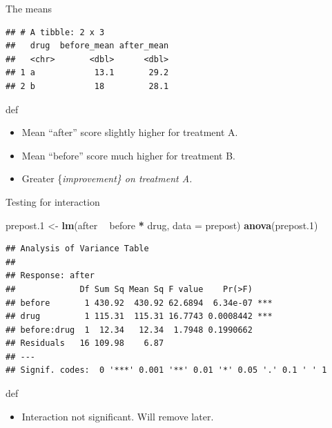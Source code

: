\documentclass[ignorenonframetext,]{beamer}
\newenvironment{Shaded}{\begin{snugshade}}{\end{snugshade}}
\newcommand{\DataTypeTok}[1]{\textcolor[rgb]{0.13,0.29,0.53}{#1}}
\newcommand{\FloatTok}[1]{\textcolor[rgb]{0.00,0.00,0.81}{#1}}
\newcommand{\KeywordTok}[1]{\textcolor[rgb]{0.13,0.29,0.53}{\textbf{#1}}}
\newcommand{\NormalTok}[1]{#1}
\newcommand{\OperatorTok}[1]{\textcolor[rgb]{0.81,0.36,0.00}{\textbf{#1}}}
\newcommand{\StringTok}[1]{\textcolor[rgb]{0.31,0.60,0.02}{#1}}
\providecommand{\tightlist}{%
  \setlength{\itemsep}{0pt}\setlength{\parskip}{0pt}}
\begin{document}
\begin{frame}[fragile]{The means}
\protect\hypertarget{the-means}{}

\begin{Shaded}
\end{Shaded}

\begin{verbatim}
## # A tibble: 2 x 3
##   drug  before_mean after_mean
##   <chr>       <dbl>      <dbl>
## 1 a            13.1       29.2
## 2 b            18         28.1
\end{verbatim}

def

\begin{itemize}
\item
  Mean ``after'' score slightly higher for treatment A.
\item
  Mean ``before'' score much higher for treatment B.
\item
  Greater \{\em improvement\} on treatment A.
\end{itemize}

\end{frame}

\begin{frame}[fragile]{Testing for interaction}
\protect\hypertarget{testing-for-interaction}{}

\begin{Shaded}
\begin{Highlighting}[]
\NormalTok{prepost}\FloatTok{.1}\NormalTok{ <-}\StringTok{ }\KeywordTok{lm}\NormalTok{(after }\OperatorTok{~}\StringTok{ }\NormalTok{before }\OperatorTok{*}\StringTok{ }\NormalTok{drug, }\DataTypeTok{data =}\NormalTok{ prepost)}
\KeywordTok{anova}\NormalTok{(prepost}\FloatTok{.1}\NormalTok{)}
\end{Highlighting}
\end{Shaded}

\begin{verbatim}
## Analysis of Variance Table
## 
## Response: after
##             Df Sum Sq Mean Sq F value    Pr(>F)    
## before       1 430.92  430.92 62.6894  6.34e-07 ***
## drug         1 115.31  115.31 16.7743 0.0008442 ***
## before:drug  1  12.34   12.34  1.7948 0.1990662    
## Residuals   16 109.98    6.87                      
## ---
## Signif. codes:  0 '***' 0.001 '**' 0.01 '*' 0.05 '.' 0.1 ' ' 1
\end{verbatim}

def

\begin{itemize}
\tightlist
\item
  Interaction not significant. Will remove later.
\end{itemize}

\end{frame}
\end{document}
